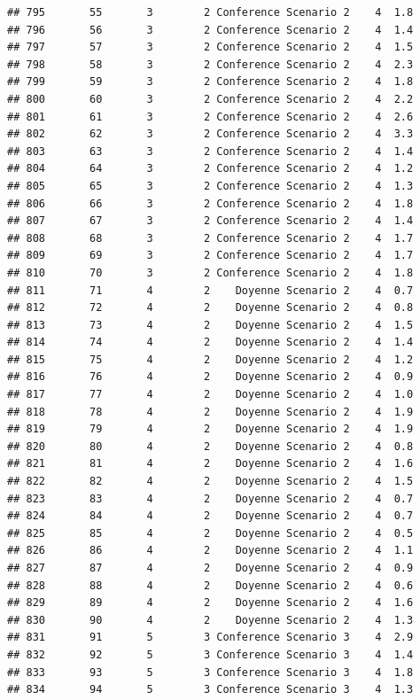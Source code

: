 \documentclass[
]{article}
\begin{document}
\begin{verbatim}
## 795       55       3        2 Conference Scenario 2    4  1.8
## 796       56       3        2 Conference Scenario 2    4  1.4
## 797       57       3        2 Conference Scenario 2    4  1.5
## 798       58       3        2 Conference Scenario 2    4  2.3
## 799       59       3        2 Conference Scenario 2    4  1.8
## 800       60       3        2 Conference Scenario 2    4  2.2
## 801       61       3        2 Conference Scenario 2    4  2.6
## 802       62       3        2 Conference Scenario 2    4  3.3
## 803       63       3        2 Conference Scenario 2    4  1.4
## 804       64       3        2 Conference Scenario 2    4  1.2
## 805       65       3        2 Conference Scenario 2    4  1.3
## 806       66       3        2 Conference Scenario 2    4  1.8
## 807       67       3        2 Conference Scenario 2    4  1.4
## 808       68       3        2 Conference Scenario 2    4  1.7
## 809       69       3        2 Conference Scenario 2    4  1.7
## 810       70       3        2 Conference Scenario 2    4  1.8
## 811       71       4        2    Doyenne Scenario 2    4  0.7
## 812       72       4        2    Doyenne Scenario 2    4  0.8
## 813       73       4        2    Doyenne Scenario 2    4  1.5
## 814       74       4        2    Doyenne Scenario 2    4  1.4
## 815       75       4        2    Doyenne Scenario 2    4  1.2
## 816       76       4        2    Doyenne Scenario 2    4  0.9
## 817       77       4        2    Doyenne Scenario 2    4  1.0
## 818       78       4        2    Doyenne Scenario 2    4  1.9
## 819       79       4        2    Doyenne Scenario 2    4  1.9
## 820       80       4        2    Doyenne Scenario 2    4  0.8
## 821       81       4        2    Doyenne Scenario 2    4  1.6
## 822       82       4        2    Doyenne Scenario 2    4  1.5
## 823       83       4        2    Doyenne Scenario 2    4  0.7
## 824       84       4        2    Doyenne Scenario 2    4  0.7
## 825       85       4        2    Doyenne Scenario 2    4  0.5
## 826       86       4        2    Doyenne Scenario 2    4  1.1
## 827       87       4        2    Doyenne Scenario 2    4  0.9
## 828       88       4        2    Doyenne Scenario 2    4  0.6
## 829       89       4        2    Doyenne Scenario 2    4  1.6
## 830       90       4        2    Doyenne Scenario 2    4  1.3
## 831       91       5        3 Conference Scenario 3    4  2.9
## 832       92       5        3 Conference Scenario 3    4  1.4
## 833       93       5        3 Conference Scenario 3    4  1.8
## 834       94       5        3 Conference Scenario 3    4  1.3

\end{verbatim}
\end{document}
